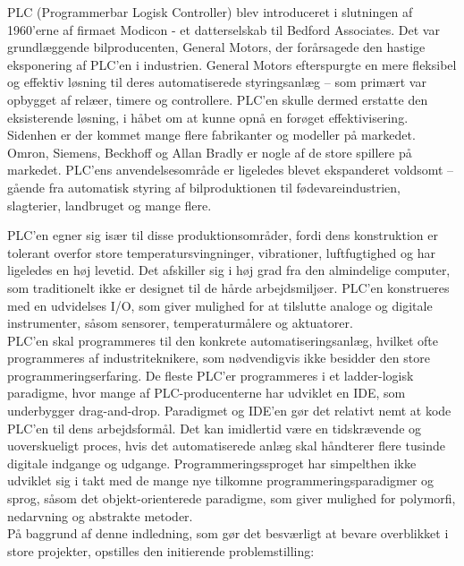 PLC (Programmerbar Logisk Controller) blev introduceret i slutningen af 1960’erne af firmaet Modicon - et datterselskab til Bedford Associates. Det var grundlæggende bilproducenten, General Motors, der forårsagede den hastige eksponering af PLC’en i industrien. General Motors efterspurgte en mere fleksibel og effektiv løsning til deres automatiserede styringsanlæg – som primært var opbygget af relæer, timere og controllere. PLC’en skulle dermed erstatte den eksisterende løsning, i håbet om at kunne opnå en forøget effektivisering. \\

Sidenhen er der kommet mange flere fabrikanter og modeller på markedet. Omron, Siemens, Beckhoff og Allan Bradly er nogle af de store spillere på markedet. PLC’ens anvendelsesområde er ligeledes blevet ekspanderet voldsomt – gående fra automatisk styring af bilproduktionen til fødevareindustrien, slagterier, landbruget og mange flere. 

PLC’en egner sig især til disse produktionsområder, fordi dens konstruktion er tolerant overfor store temperatursvingninger, vibrationer, luftfugtighed og har ligeledes en høj levetid. Det afskiller sig i høj grad fra den almindelige computer, som traditionelt ikke er designet til de hårde arbejdsmiljøer. PLC’en konstrueres med en udvidelses I/O, som giver mulighed for at tilslutte analoge og digitale instrumenter, såsom sensorer, temperaturmålere og aktuatorer. \\

PLC’en skal programmeres til den konkrete automatiseringsanlæg, hvilket ofte programmeres af industriteknikere, som nødvendigvis ikke besidder den store programmeringserfaring. De fleste PLC’er programmeres i et ladder-logisk paradigme, hvor mange af PLC-producenterne har udviklet en IDE, som underbygger drag-and-drop. Paradigmet og IDE’en gør det relativt nemt at kode PLC’en til dens arbejdsformål. Det kan imidlertid være en tidskrævende og uoverskueligt proces, hvis det automatiserede anlæg skal håndterer flere tusinde digitale indgange og udgange. Programmeringssproget har simpelthen ikke udviklet sig i takt med de mange nye tilkomne programmeringsparadigmer og sprog, såsom det objekt-orienterede paradigme, som giver mulighed for polymorfi, nedarvning og abstrakte metoder. \\

På baggrund af denne indledning, som gør det besværligt at bevare overblikket i store projekter, opstilles den initierende problemstilling: \\

